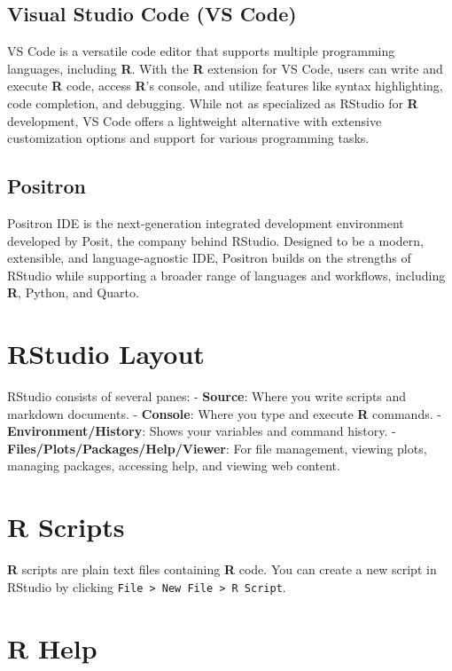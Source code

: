 \documentclass[
  letterpaper,
  DIV=11,
  numbers=noendperiod]{scrreprt}
\begin{document}
\subsection{Visual Studio Code (VS
Code)}\label{visual-studio-code-vs-code}

VS Code is a versatile code editor that supports multiple programming
languages, including \textbf{R}. With the \textbf{R} extension for VS
Code, users can write and execute \textbf{R} code, access \textbf{R}'s
console, and utilize features like syntax highlighting, code completion,
and debugging. While not as specialized as RStudio for \textbf{R}
development, VS Code offers a lightweight alternative with extensive
customization options and support for various programming tasks.

\subsection{Positron}\label{positron}

Positron IDE is the next-generation integrated development environment
developed by Posit, the company behind RStudio. Designed to be a modern,
extensible, and language-agnostic IDE, Positron builds on the strengths
of RStudio while supporting a broader range of languages and workflows,
including \textbf{R}, Python, and Quarto.

\section{RStudio Layout}\label{rstudio-layout}

RStudio consists of several panes: - \textbf{Source}: Where you write
scripts and markdown documents. - \textbf{Console}: Where you type and
execute \textbf{R} commands. - \textbf{Environment/History}: Shows your
variables and command history. -
\textbf{Files/Plots/Packages/Help/Viewer}: For file management, viewing
plots, managing packages, accessing help, and viewing web content.

\section{R Scripts}\label{r-scripts}

\textbf{R} scripts are plain text files containing \textbf{R} code. You
can create a new script in RStudio by clicking
\texttt{File\ \textgreater{}\ New\ File\ \textgreater{}\ R\ Script}.

\section{R Help}\label{r-help}
\end{document}
